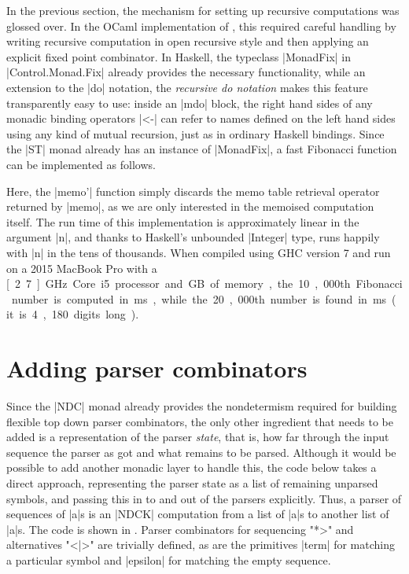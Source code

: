 \documentclass[a4paper,10pt]{article}
\begin{document}
In the previous section, the mechanism for setting up recursive computations was glossed over.
In the OCaml implementation of \cite{Abdallah2017a}, this required careful handling by writing
recursive computation in open recursive style and then applying an explicit fixed point combinator. In Haskell,
the typeclass |MonadFix| in |Control.Monad.Fix| already provides the necessary functionality,
while an extension to the |do| notation, the \emph{recursive do notation} \citep{ErkokLaunchbury2000}
makes this feature transparently easy to use: inside an |mdo| block, the right hand sides of any monadic binding operators |<-|
can refer to names defined on the left hand sides using any kind of mutual recursion, just as in ordinary Haskell
bindings. Since the |ST| monad already has an instance of |MonadFix|, a fast Fibonacci function can be implemented as follows.
Here, the |memo'| function simply discards the memo table retrieval operator returned by |memo|, as  we are only
interested in the memoised computation itself. The run time of this implementation is approximately
linear in the argument |n|, and thanks to Haskell's unbounded |Integer| type, runs
happily with |n| in the tens of thousands. When compiled using GHC version 7 and run on
a 2015 MacBook Pro with a \unit[2.7]{GHz} Core i5 processor and \unit[8]{GB} of memory, 
the 10,000th Fibonacci number is computed in \unit[70]{ms},
while the 20,000th number is found in \unit[130]{ms} (it is 4,180 digits long).

\section{Adding parser combinators}

Since the |NDC| monad already provides the nondetermism required for
building flexible top down parser combinators, the only other ingredient
that needs to be added is a representation of the parser \emph{state}, that
is, how far through the input sequence the parser as got and what remains
to be parsed. Although it would be possible to add another monadic layer
to handle this, the code below takes a direct approach,
representing the parser state as a list of remaining unparsed symbols,
and passing this in to and out of the parsers explicitly.
Thus, a parser of sequences of |a|s is an |NDCK| computation from a list
of |a|s to another list of |a|s.  The code is shown in .
Parser combinators for sequencing "*>" and alternatives "<|>" are trivially defined,
as are the primitives |term| for matching a particular symbol and |epsilon| for matching 
the empty sequence. 
\end{document}
